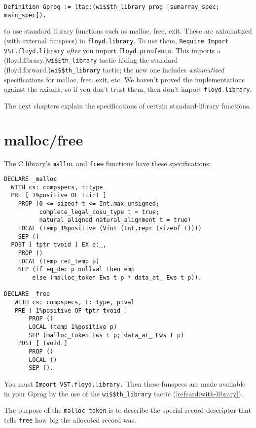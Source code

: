 \documentclass[12pt,fleqn,openany,oneside,showtrims]{memoir}
\begin{document}
\begin{lstlisting}
Definition Gprog := ltac:(wi$$th_library prog [sumarray_spec; main_spec]).
\end{lstlisting}

 to use standard library functions such as
\textsf{malloc}, \textsf{free}, \textsf{exit}.  These are axiomatized
(with external funspecs) in \lstinline{floyd.library}.  To use them,
\lstinline{Require Import VST.floyd.library} \emph{after} you
import \lstinline{floyd.proofauto}.  This imports
a (floyd.library.)\lstinline{wi$$th_library} tactic hiding the standard
\linebreak[4]
(floyd.forward.)\lstinline{wi$$th_library} tactic;
the new one includes \emph{axiomatized} specifications for
malloc, free, exit, etc.  We haven't proved the implementations
against the axioms, so if you don't trust them, then don't
import \lstinline{floyd.library}.

The next chapters explain the specifications of certain
standard-library functions.

\chapter{malloc/free}
\label{refcard:malloc}

The C library's \lstinline|malloc| and \lstinline|free| functions
have these specifications:
\begin{lstlisting}
DECLARE _malloc
  WITH cs: compspecs, t:type
  PRE [ 1%positive OF tuint ]
    PROP (0 <= sizeof t <= Int.max_unsigned;
          complete_legal_cosu_type t = true;
          natural_aligned natural_alignment t = true)
    LOCAL (temp 1%positive (Vint (Int.repr (sizeof t))))
    SEP ()
  POST [ tptr tvoid ] EX p:_,
    PROP ()
    LOCAL (temp ret_temp p)
    SEP (if eq_dec p nullval then emp
        else (malloc_token Ews t p * data_at_ Ews t p)).

DECLARE _free
   WITH cs: compspecs, t: type, p:val
   PRE [ 1%positive OF tptr tvoid ]
       PROP ()
       LOCAL (temp 1%positive p)
       SEP (malloc_token Ews t p; data_at_ Ews t p)
    POST [ Tvoid ]
       PROP ()
       LOCAL ()
       SEP ().
\end{lstlisting}
You must \lstinline{Import VST.floyd.library.}
Then these funspecs are made available in your Gprog by the use of the
\lstinline{wi$$th_library} tactic (\autoref{refcard:with-library}).

The purpose of the \lstinline{malloc_token} is to describe the special
record-descriptor that tells \lstinline{free} how big the allocated
record was.
\end{document}
